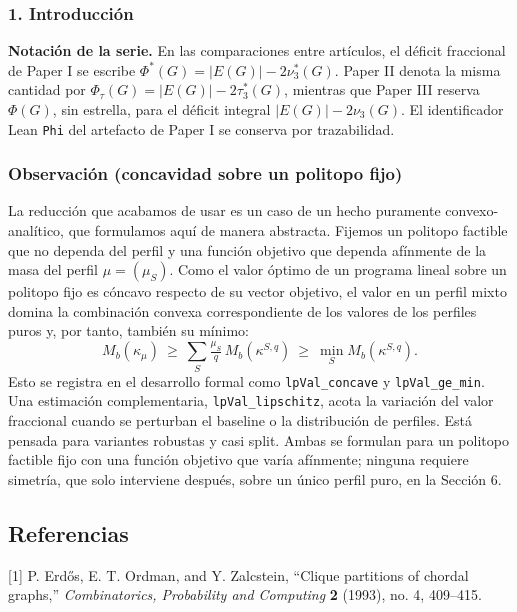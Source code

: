 \documentclass[spanish,11pt,a4paper]{article}
\begin{document}
\subsubsection{1. Introducción}\label{introducciuxf3n}

\textbf{Notación de la serie.} En las comparaciones entre artículos, el
déficit fraccional de Paper I se escribe
\(\Phi^*(G)=|E(G)|-2\nu_3^*(G)\). Paper II denota la misma cantidad por
\(\Phi_\tau(G)=|E(G)|-2\tau_3^*(G)\), mientras que Paper III reserva
\(\Phi(G)\), sin estrella, para el déficit integral
\(|E(G)|-2\nu_3(G)\). El identificador Lean \nolinkurl{Phi} del artefacto
de Paper I se conserva por trazabilidad.

\subsubsection{Observación (concavidad sobre un politopo
fijo)}\label{observaciuxf3n-concavidad-sobre-un-politopo-fijo}

La reducción que acabamos de usar es un caso de un hecho puramente
convexo-analítico, que formulamos aquí de manera abstracta. Fijemos un
politopo factible que no dependa del perfil y una función objetivo que
dependa afínmente de la masa del perfil \(\mu=(\mu_S)\). Como el valor
óptimo de un programa lineal sobre un politopo fijo es cóncavo respecto
de su vector objetivo, el valor en un perfil mixto domina la combinación
convexa correspondiente de los valores de los perfiles puros y, por
tanto, también su mínimo: \[
M_b(\kappa_\mu)\ \ge\ \sum_S \tfrac{\mu_S}{q}\,M_b(\kappa^{S,q})\ \ge\ \min_S M_b(\kappa^{S,q}).
\] Esto se registra en el desarrollo formal como \nolinkurl{lpVal_concave}
y \nolinkurl{lpVal_ge_min}. Una estimación complementaria,
\nolinkurl{lpVal_lipschitz}, acota la variación del valor fraccional
cuando se perturban el baseline o la distribución de perfiles. Está
pensada para variantes robustas y casi split. Ambas se formulan para un
politopo factible fijo con una función objetivo que varía afínmente;
ninguna requiere simetría, que solo interviene después, sobre un único
perfil puro, en la Sección 6.

\subsection{Referencias}\label{referencias}

{[}1{]} P. Erdős, E. T. Ordman, and Y. Zalcstein, ``Clique partitions of
chordal graphs,'' \emph{Combinatorics, Probability and Computing}
\textbf{2} (1993), no. 4, 409--415.
\end{document}
